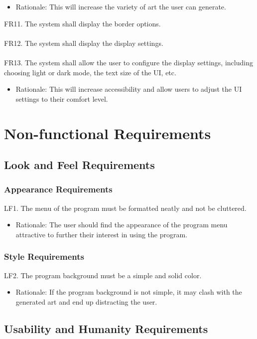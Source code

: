 \documentclass[12pt, titlepage]{article}
\begin{document}
\begin{itemize}
    \item Rationale: This will increase the variety of art the user can generate.
\end{itemize}
FR11. The system shall display the border options.\\
\\
FR12. The system shall display the display settings.\\
\\
FR13. The system shall allow the user to configure the display settings, including choosing light or dark mode, the text size of the UI, etc.
\begin{itemize}
    \item Rationale: This will increase accessibility and allow users to adjust the UI settings to their comfort level.
\end{itemize}

\section{Non-functional Requirements}

\subsection{Look and Feel Requirements}

\subsubsection{Appearance Requirements}
LF1. The menu of the program must be formatted neatly and not be cluttered.
\begin{itemize}
    \item Rationale: The user should find the appearance of the program menu attractive to further their interest in using the program.
\end{itemize}
\subsubsection{Style Requirements}
LF2. The program background must be a simple and solid color.
\begin{itemize}
    \item Rationale: If the program background is not simple, it may clash with the generated art and end up distracting the user.
\end{itemize}

\subsection{Usability and Humanity Requirements}
\end{document}
